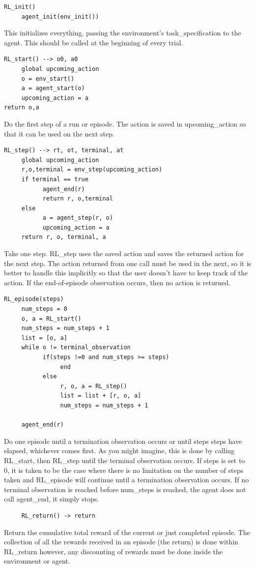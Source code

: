 \documentclass[11pt]{article}
\begin{document}
\begin{verbatim}
RL_init()
     agent_init(env_init())
\end{verbatim}
This initializes everything, passing the environment's task\_specification to the agent. This should be called at the beginning of every trial.
\begin{verbatim}
RL_start() --> o0, a0
     global upcoming_action
     o = env_start()
     a = agent_start(o)
     upcoming_action = a
return o,a
\end{verbatim}
Do the first step of a run or episode.  The action is saved in upcoming\_action so that it can be used on the next step.
\begin{verbatim}
RL_step() --> rt, ot, terminal, at
     global upcoming_action
     r,o,terminal = env_step(upcoming_action)
     if terminal == true
           agent_end(r)
           return r, o,terminal
     else
           a = agent_step(r, o)
           upcoming_action = a
     return r, o, terminal, a 
\end{verbatim}
Take one step.  RL\_step uses the saved action and saves the returned action for the next step.  The action returned from one call must be used in the next, so it is better to handle this implicitly so that the user doesn't have to keep track of the action.  If the end-of-episode observation occurs, then no action is returned.
\begin{verbatim}
RL_episode(steps)
     num_steps = 0
     o, a = RL_start()
     num_steps = num_steps + 1
     list = [o, a]
     while o != terminal_observation
           if(steps !=0 and num_steps >= steps)
                end
           else
                r, o, a = RL_step()
                list = list + [r, o, a]
                num_steps = num_steps + 1
           
     agent_end(r)
\end{verbatim}
Do one episode until a termination observation occurs or until steps steps have elapsed, whichever comes first.  As you might imagine, this is done by calling RL\_start, then RL\_step until the terminal observation occurs.  If steps is set to 0, it is taken to be the case where there is no limitation on the number of steps taken and RL\_episode will continue until a termination observation occurs. If no terminal observation is reached before num\_steps is reached, the agent does not call agent\_end, it simply stops.
\begin{verbatim}
     RL_return() -> return
\end{verbatim}
Return the cumulative total reward of the current or just completed episode.  The collection of all the rewards received in an episode (the return) is done within RL\_return however, any discounting of rewards must be done inside the environment or agent.
\end{document}
